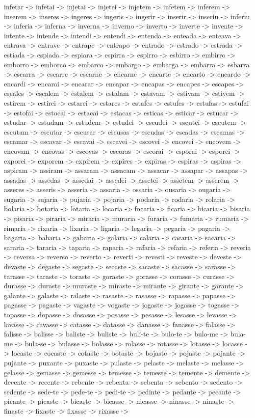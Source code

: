 \documentclass[a4paper,11pt]{article}
\begin{document}
infetar -> infetai -> injetai -> injetei -> injetem -> infetem -> inferem -> inserem -> inseres -> ingeres -> ingeris -> ingerir -> inserir -> inseriu -> inferiu -> inferia -> inferna -> inverna -> inverno -> inverto -> inverte -> invente -> intente -> intende -> intendi -> entendi -> entenda -> enteada -> enteava -> entrava -> entrave -> entrape -> entrapo -> entrado -> estrado -> estrada -> estiada -> espiada -> espiara -> espirra -> espirro -> esbirro -> embirro -> emborro -> emborco -> embarco -> embargo -> embarga -> embarra -> esbarra -> escarra -> escarre -> escarne -> encarne -> encarte -> encarto -> encardo -> encardi -> encarai -> encarar -> encapar -> encapas -> encapes -> escapes -> escales -> escalem -> estalem -> estalam -> estavam -> estivam -> estivem -> estirem -> estirei -> estarei -> estares -> estafes -> estufes -> estufas -> estufai -> estofai -> estocai -> estacai -> estacas -> esticas -> esticar -> estucar -> estudar -> estudam -> estudem -> estudei -> escudei -> escutei -> escutem -> escutam -> escutar -> escusar -> escusas -> escudas -> escadas -> escamas -> escamar -> escavar -> escavai -> escavei -> escovei -> encovei -> encovem -> encovam -> encovas -> escovas -> escoras -> escorai -> esporai -> esporei -> exporei -> exporem -> expirem -> expires -> expiras -> espiras -> aspiras -> aspiram -> assiram -> assaram -> assacam -> assacar -> assapar -> assapas -> assadas -> assedas -> assedai -> assedei -> assetei -> assetem -> asserem -> asseres -> asseris -> asseria -> assaria -> ossaria -> ousaria -> ougaria -> sugaria -> sujaria -> pujaria -> pojaria -> podaria -> rodaria -> rolaria -> bolaria -> botaria -> lotaria -> locaria -> focaria -> ficaria -> bicaria -> bisaria -> pisaria -> piraria -> miraria -> muraria -> furaria -> fumaria -> rumaria -> rimaria -> rixaria -> lixaria -> ligaria -> legaria -> pegaria -> pagaria -> bagaria -> babaria -> gabaria -> galaria -> calaria -> cacaria -> sacaria -> sararia -> tararia -> taparia -> raparia -> rafaria -> refaria -> referia -> reveria -> reversa -> reverso -> reverto -> reverti -> revesti -> reveste -> deveste -> devaste -> degaste -> segaste -> secaste -> sacaste -> sacasse -> sarasse -> tarasse -> taraste -> toraste -> goraste -> gorasse -> corasse -> curasse -> durasse -> duraste -> muraste -> miraste -> mirante -> girante -> garante -> galante -> galaste -> ralaste -> rasaste -> rasasse -> rapasse -> papasse -> pagasse -> pagaste -> vagaste -> vogaste -> jogaste -> jogasse -> togasse -> topasse -> dopasse -> dosasse -> posasse -> pesasse -> lesasse -> levasse -> lavasse -> cavasse -> catasse -> datasse -> danasse -> fanasse -> falasse -> falisse -> balisse -> baliste -> buliste -> buli-te -> bulo-te -> bulo-me -> bula-me -> bula-se -> bulasse -> bolasse -> rolasse -> rotasse -> lotasse -> locasse -> locaste -> cocaste -> cotaste -> botaste -> bojaste -> pojaste -> pojante -> pujante -> puxante -> puxaste -> pulaste -> pelaste -> melaste -> melasse -> gelasse -> gemasse -> gemesse -> temesse -> temeste -> temente -> demente -> decente -> recente -> rebente -> rebenta -> sebenta -> sebento -> sedento -> sedente -> sede-te -> pede-te -> pedi-te -> pedinte -> pedante -> pecante -> picante -> picaste -> bicaste -> bicasse -> nicasse -> ninasse -> ninaste -> finaste -> fixaste -> fixasse -> rixasse -> 
\end{document}
